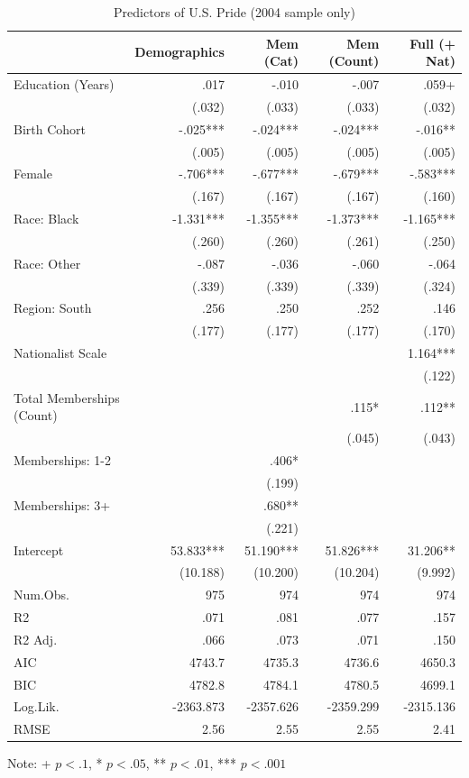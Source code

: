 \begin{table}[htbp]
\centering
\begin{threeparttable}
\caption{Predictors of U.S. Pride (2004 sample only)}
\label{tab:full2004}
\small
\begin{tabular}{lrrrr}
\toprule
& Demographics & Mem (Cat) & Mem (Count) & Full (+ Nat) \\
\midrule
Education (Years) & .017 & -.010 & -.007 & .059+ \\
& (.032) & (.033) & (.033) & (.032) \\
Birth Cohort & -.025*** & -.024*** & -.024*** & -.016** \\
& (.005) & (.005) & (.005) & (.005) \\
Female & -.706*** & -.677*** & -.679*** & -.583*** \\
& (.167) & (.167) & (.167) & (.160) \\
Race: Black & -1.331*** & -1.355*** & -1.373*** & -1.165*** \\
& (.260) & (.260) & (.261) & (.250) \\
Race: Other & -.087 & -.036 & -.060 & -.064 \\
& (.339) & (.339) & (.339) & (.324) \\
Region: South & .256 & .250 & .252 & .146 \\
& (.177) & (.177) & (.177) & (.170) \\
Nationalist Scale &  &  &  & 1.164*** \\
&  &  &  & (.122) \\
Total Memberships (Count) &  &  & .115* & .112** \\
&  &  & (.045) & (.043) \\
Memberships: 1-2 &  & .406* &  & \\
&  & (.199) &  & \\
Memberships: 3+ &  & .680** &  & \\
&  & (.221) &  & \\
Intercept & 53.833*** & 51.190*** & 51.826*** & 31.206** \\
& (10.188) & (10.200) & (10.204) & (9.992) \\
Num.Obs. & 975 & 974 & 974 & 974 \\
R2 & .071 & .081 & .077 & .157 \\
R2 Adj. & .066 & .073 & .071 & .150 \\
AIC & 4743.7 & 4735.3 & 4736.6 & 4650.3 \\
BIC & 4782.8 & 4784.1 & 4780.5 & 4699.1 \\
Log.Lik. & -2363.873 & -2357.626 & -2359.299 & -2315.136 \\
RMSE & 2.56 & 2.55 & 2.55 & 2.41 \\
\bottomrule
\end{tabular}
\begin{tablenotes}
\small
Note: + $p < .1$, * $p < .05$, ** $p < .01$, *** $p < .001$
\end{tablenotes}
\end{threeparttable}
\end{table}
